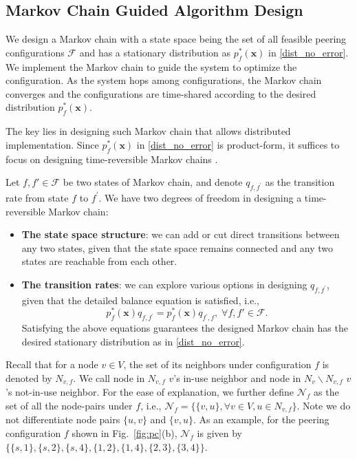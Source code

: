 \documentclass[10pt,conference]{IEEEtran}
\begin{document}
\subsection{Markov Chain Guided Algorithm Design}

We design a Markov chain with a state space being the set of all feasible peering configurations $\mathcal{F}$ and has a stationary distribution as $p_{f}^{*}(\boldsymbol{x})$ in \eqref{dist_no_error}. We implement the Markov chain to guide the system to optimize the configuration. As the system hops among configurations, the Markov chain converges and the configurations are time-shared according to the desired distribution $p_{f}^{*}(\boldsymbol{x})$.

The key lies in designing such Markov chain that allows distributed
implementation. Since $p_{f}^{*}(\boldsymbol{x})$ in \eqref{dist_no_error}
is product-form, it suffices to focus on designing time-reversible Markov chains
\cite{MA:CLSC10}.

Let $f,f'\in\mathcal{F}$ be two states of Markov chain, and denote
$q_{f,f^{'}}$ as the transition rate from state $f$
to $f^{'}$. We have two degrees of freedom in designing a time-reversible
Markov chain:
\begin{itemize}
\item \textbf{The state space structure}: we can add or
cut direct transitions between any two states, given that the state
space remains connected and any two states are reachable from each
other.
\item \textbf{The transition rates}: we can explore various options
in designing $q_{f,f^{'}}$, given that the detailed balance
equation is satisfied, i.e., \begin{equation}
p_{f}^{*}(\boldsymbol{x})q_{f,f^{'}}=p_{f}^{*}(\boldsymbol{x})q_{f^{'},f},\;\forall f,f'\in\mathcal{F}.\label{eq:detailed.balance.eq}\end{equation}
Satisfying the above equations guarantees the designed Markov chain has the desired stationary distribution
as in \eqref{dist_no_error}.
\end{itemize}

Recall that for a node $v\in V$, the set of its neighbors under configuration
$f$ is denoted by $N_{v,f}$. We call node in $N_{v,f}$ $v$'s in-use neighbor and node in $N_{v}\backslash N_{v,f}$ $v$'s not-in-use neighbor. For the ease of explanation,
we further define $\mathcal{N}_{f}$ as the set of all the node-pairs under $f$, i.e., $\mathcal{N}_{f}=\{\{v,u\}, \forall v\in V,u\in N_{v,f}\}$. Note we do not differentiate node pairs $\{u, v\}$ and $\{v, u\}$.
As an example, for the peering configuration $f$ shown in Fig.~\ref{fig:pc}(b), $\mathcal{N}_{f}$ is given by $\{\{s,1\},\{s,2\},\{s,4\},\{1,2\},\{1,4\},\{2,3\}, \{3,4\}\}$.
\end{document}
